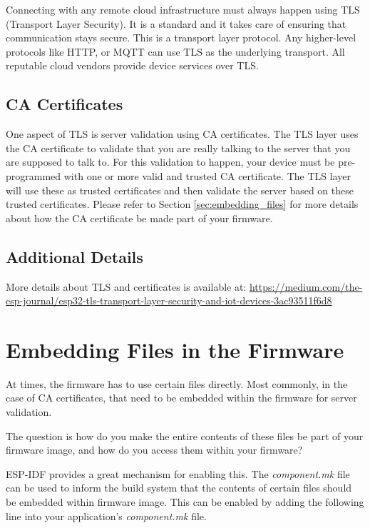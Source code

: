 \documentclass[main.tex]{subfiles}
\begin{document}
Connecting with any remote cloud infrastructure must always happen using TLS (Transport Layer Security). It is a standard and it takes care of ensuring that communication stays secure. This is a transport layer protocol. Any higher-level protocols like HTTP, or MQTT can use TLS as the underlying transport. All reputable cloud vendors provide device services over TLS.

\subsection{CA Certificates}
One aspect of TLS is server validation using CA certificates. The TLS layer uses the CA certificate to validate that you are really talking to the server that you are supposed to talk to. For this validation to happen, your device must be pre-programmed with one or more valid and trusted CA certificate. The TLS layer will use these as trusted certificates and then validate the server based on these trusted certificates. Please refer to Section \ref{sec:embedding_files} for more details about how the CA certificate be made part of your firmware.

\subsection{Additional Details}

More details about TLS and certificates is available at: \url{https://medium.com/the-esp-journal/esp32-tls-transport-layer-security-and-iot-devices-3ac93511f6d8}

\section{Embedding Files in the Firmware}\label{sec:embedding_files}
At times, the firmware has to use certain files directly. Most commonly, in the case of CA certificates, that need to be embedded within the firmware for server validation.

The question is how do you make the entire contents of these files be part of your firmware image, and how do you access them within your firmware?

ESP-IDF provides a great mechanism for enabling this. The \textit{component.mk} file can be used to inform the build system that the contents of certain files should be embedded within firmware image. This can be enabled by adding the following line into your application's \textit{component.mk} file.
\end{document}
